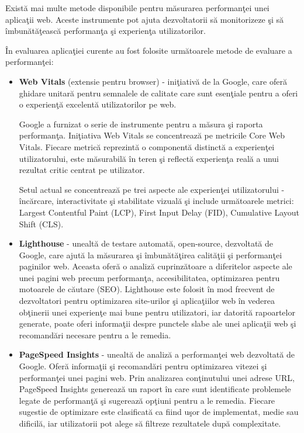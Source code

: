 \documentclass[12pt, a4paper]{report}
\begin{document}
Exist\u a mai multe metode disponibile pentru m\u asurarea performan\c tei unei aplica\c tii web. Aceste instrumente pot ajuta dezvoltatorii s\u a monitorizeze \c si s\u a \^imbun\u at\u a\c teasc\u a performan\c ta \c si experien\c ta utilizatorilor.

\^In evaluarea aplica\c tiei curente au fost folosite urm\u atoarele metode de evaluare a performan\c tei:

\begin{itemize}
	\item  \textbf{Web Vitals} (extensie pentru browser) - ini\c tiativ\u a de la Google, care ofer\u a ghidare unitar\u a pentru semnalele de calitate care sunt esen\c tiale pentru a oferi o experien\c t\u a excelent\u a utilizatorilor pe web.

	      Google a furnizat o serie de instrumente pentru a m\u asura \c si raporta performan\c ta. Ini\c tiativa Web Vitals se concentreaz\u a pe metricile Core Web Vitals. Fiecare metric\u a reprezint\u a o component\u a distinct\u a a experien\c tei utilizatorului, este m\u asurabil\u a \^in teren \c si reflect\u a experien\c ta real\u a a unui rezultat critic centrat pe utilizator. \cite{web-vitals}

	      Setul actual se concentreaz\u a pe trei aspecte ale experien\c tei utilizatorului - \^inc\u arcare, interactivitate \c si stabilitate vizual\u a \c si include urm\u atoarele metrici: Largest Contentful Paint (LCP), First Input Delay (FID), Cumulative Layout Shift (CLS).

	\item \textbf{Lighthouse} - unealt\u a de testare automat\u a, open-source, dezvoltat\u a de Google, care ajut\u a la m\u asurarea \c si \^imbun\u at\u a\c tirea calit\u a\c tii \c si performan\c tei paginilor web. Aceasta ofer\u a o analiz\u a cuprinz\u atoare a diferitelor aspecte ale unei pagini web precum performan\c ta, accesibilitatea, optimizarea pentru motoarele de c\u autare (SEO). Lighthouse este folosit \^in mod frecvent de dezvoltatori pentru optimizarea site-urilor \c si aplica\c tiilor web \^in vederea ob\c tinerii unei experien\c te mai bune pentru utilizatori, iar datorit\u a rapoartelor generate, poate oferi informa\c tii despre punctele slabe ale unei aplica\c tii web \c si recomand\u ari necesare pentru a le remedia.

	\item \textbf{PageSpeed Insights} - unealt\u a de analiz\u a a performan\c tei web dezvoltat\u a de Google. Ofer\u a informa\c tii \c si recomand\u ari pentru optimizarea vitezei \c si performan\c tei unei pagini web. Prin analizarea con\c tinutului unei adrese URL, PageSpeed Insights genereaz\u a un raport \^in care sunt identificate problemele legate de performan\c t\u a \c si sugereaz\u a op\c tiuni pentru a le remedia. Fiecare sugestie de optimizare este clasificat\u a ca fiind u\c sor de implementat, medie sau dificil\u a, iar utilizatorii pot alege s\u a filtreze rezultatele dup\u a complexitate.
\end{itemize}
\end{document}
